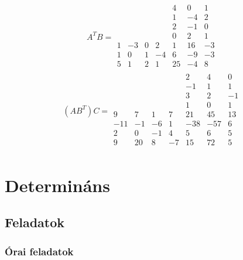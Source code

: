 \documentclass[12pt,a4paper,fleqn]{article}
\begin{document}
\[
  A^{T}B =
  \begin{array}{cccc|ccc}
    &    &   &    & 4  & 0  & 1  \\
    &    &   &    & 1  & -4 & 2  \\
    &    &   &    & 2  & -1 & 0  \\
    &    &   &    & 0  & 2  & 1  \\ \hline
  1 & -3 & 0 & 2  & 1  & 16 & -3 \\
  1 & 0  & 1 & -4 & 6  & -9 & -3 \\
  5 & 1  & 2 & 1  & 25 & -4 & 8  \\
\end{array}
\]
\[
  (AB^{T})C =
  \begin{array}{cccc|ccc}
      &    &    &    & 2   & 4   & 0  \\
      &    &    &    & -1  & 1   & 1  \\
      &    &    &    & 3   & 2   & -1 \\
      &    &    &    & 1   & 0   & 1  \\ \hline
  9   & 7  & 1  & 7  & 21  & 45  & 13 \\
  -11 & -1 & -6 & 1  & -38 & -57 & 6  \\
  2   & 0  & -1 & 4  & 5   & 6   & 5  \\
  9   & 20 & 8  & -7 & 15  & 72  & 5  \\
  \end{array}
\]

\clearpage
\section{Determináns}
\setcounter{subsection}{1}
\subsection{Feladatok}
\subsubsection{Órai feladatok}
\end{document}
